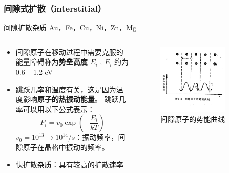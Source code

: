 \documentclass[xcolor=table,dvipsnames,svgnames,aspectratio=169]{ctexbeamer}
\begin{document}
\begin{frame}
  \frametitle{间隙式扩散（interstitial）}

  \begin{block}{间隙扩散杂质}
    Au，Fe，Cu，Ni，Zn，Mg
  \end{block}

  \begin{columns}
    \begin{column}{0.7\textwidth}
      \begin{itemize}
        \item 间隙原子在移动过程中需要克服的能量障碍称为\textbf{势垒高度 $E_i$} , $E_i$ 约为 0.6 ~ 1.2 eV
        \item 跳跃几率和温度有关，这是因为温度影响\textbf{原子的热振动能量}。
          跳跃几率可以用以下公式表示：
          \[
            P_i = v_0 \exp(-\frac{E_i}{kT})
          \]
          $v_0 = 10^{13} \to 10^{14}/s$：振动频率，间隙原子在晶格中振动的频率。
        \item 快扩散杂质：具有较高的扩散速率
      \end{itemize}
    \end{column}
    \begin{column}{0.3\textwidth}
      \begin{figure}
        \centering
        \includegraphics[width=0.8\textwidth]{间隙原子的势能曲线.png}
        \caption{间隙原子的势能曲线}
      \end{figure}
    \end{column}
  \end{columns}

\end{frame}
\end{document}
